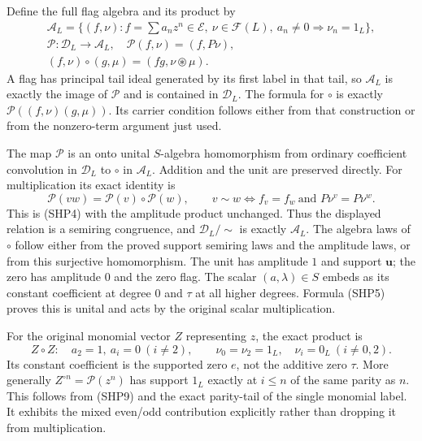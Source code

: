 Define the full flag algebra and its product by
\begin{equation}\tag{SHP8}
 \begin{gathered}
 \mathcal A_L=\{(f,\nu):f=\sum a_nz^n\in\mathcal E,\
        \nu\in\mathcal F(L),\
                    a_n\ne0\Rightarrow\nu_n=1_L\},\\
 \mathcal P:\mathcal D_L\longrightarrow\mathcal A_L,\quad
              \mathcal P(f,\nu)=(f,P\nu),\\
 (f,\nu)\circ(g,\mu)=(fg,\nu\circledast\mu).
 \end{gathered}
\end{equation}
A flag has principal tail ideal generated by its first
label in that tail, so $\mathcal A_L$ is exactly the image
of $\mathcal P$ and is contained in $\mathcal D_L$.
The formula for $\circ$ is exactly
$\mathcal P((f,\nu)(g,\mu))$.
Its carrier condition follows either from that construction
or from the nonzero-term argument just used.

The map $\mathcal P$ is an onto unital $S$-algebra homomorphism
from ordinary coefficient convolution in $\mathcal D_L$
to $\circ$ in $\mathcal A_L$.
Addition and the unit are preserved directly.
For multiplication its exact identity is
\begin{equation}\tag{SHP9}
 \mathcal P(vw)=\mathcal P(v)\circ\mathcal P(w),\qquad
 v\sim w\Longleftrightarrow
       f_v=f_w\ \text{and }P\nu^v=P\nu^w .
\end{equation}
This is (SHP4) with the amplitude product unchanged.
Thus the displayed relation is a semiring congruence,
and $\mathcal D_L/\!\sim$ is exactly $\mathcal A_L$.
The algebra laws of $\circ$ follow either from the proved
support semiring laws and the amplitude laws, or from this
surjective homomorphism. The unit has amplitude $1$ and
support $\mathbf u$; the zero has amplitude $0$ and the
zero flag. The scalar $(a,\lambda)\in S$ embeds as its
constant coefficient at degree $0$ and $\tau$ at all
higher degrees. Formula (SHP5) proves this is unital and
acts by the original scalar multiplication.

For the original monomial vector $Z$ representing $z$,
the exact product is
\begin{equation}\tag{SHP10}
 Z\circ Z:
 \quad a_2=1,\ a_i=0\ (i\ne2),\qquad
 \nu_0=\nu_2=1_L,\quad\nu_i=0_L\ (i\ne0,2).
\end{equation}
Its constant coefficient is the supported zero $e$,
not the additive zero $\tau$.
More generally $Z^{\circ n}=\mathcal P(z^n)$ has support
$1_L$ exactly at $i\le n$ of the same parity as $n$.
This follows from (SHP9) and the exact parity-tail of
the single monomial label. It exhibits the mixed
even/odd contribution explicitly rather than dropping
it from multiplication.

